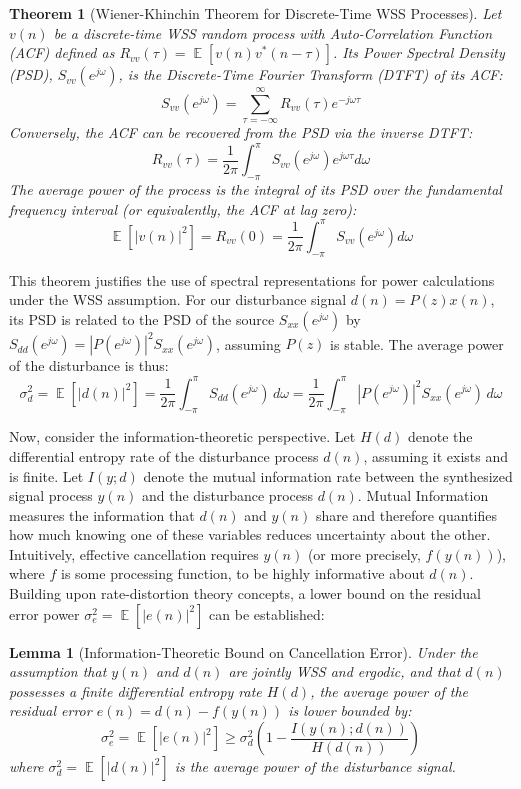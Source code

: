 \documentclass{article}
\DeclareMathOperator{\E}{\mathbb{E}} %
\newtheorem{theorem}{Theorem}
\newtheorem{lemma}{Lemma}
\begin{document}
\begin{theorem}[Wiener-Khinchin Theorem for Discrete-Time WSS Processes]
Let \( v(n) \) be a discrete-time WSS random process with Auto-Correlation Function (ACF) defined as \( R_{vv}(\tau) = \E[v(n)v^*(n-\tau)] \). Its Power Spectral Density (PSD), \( S_{vv}(e^{j\omega}) \), is the Discrete-Time Fourier Transform (DTFT) of its ACF:
$$ S_{vv}(e^{j\omega}) = \sum_{\tau=-\infty}^{\infty} R_{vv}(\tau) e^{-j\omega\tau} $$
Conversely, the ACF can be recovered from the PSD via the inverse DTFT:
$$ R_{vv}(\tau) = \frac{1}{2\pi} \int_{-\pi}^{\pi} S_{vv}(e^{j\omega}) e^{j\omega\tau} d\omega $$
The average power of the process is the integral of its PSD over the fundamental frequency interval (or equivalently, the ACF at lag zero):
$$ \E[|v(n)|^2] = R_{vv}(0) = \frac{1}{2\pi} \int_{-\pi}^{\pi} S_{vv}(e^{j\omega}) d\omega $$
\end{theorem}

This theorem justifies the use of spectral representations for power calculations under the WSS assumption. For our disturbance signal \( d(n) = P(z)x(n) \), its PSD is related to the PSD of the source \( S_{xx}(e^{j\omega}) \) by \( S_{dd}(e^{j\omega}) = |P(e^{j\omega})|^2 S_{xx}(e^{j\omega}) \), assuming \( P(z) \) is stable. The average power of the disturbance is thus:
\begin{equation}
\sigma_d^2 = \E[|d(n)|^2] = \frac{1}{2\pi} \int_{-\pi}^{\pi} S_{dd}(e^{j\omega}) \, d\omega = \frac{1}{2\pi} \int_{-\pi}^{\pi} |P(e^{j\omega})|^2 S_{xx}(e^{j\omega}) \, d\omega
\label{eq:d_power_psd}
\end{equation}

Now, consider the information-theoretic perspective. Let \( H(d) \) denote the differential entropy rate of the disturbance process \( d(n) \), assuming it exists and is finite. Let \( I(y; d) \) denote the mutual information rate between the synthesized signal process \( y(n) \) and the disturbance process \( d(n) \). Mutual Information measures the information that \(d(n)\) and \(y(n)\) share and therefore quantifies how much knowing one of these variables reduces uncertainty about the other. Intuitively, effective cancellation requires \( y(n) \) (or more precisely, \( f(y(n)) \)), where $f$ is some processing function, to be highly informative about \( d(n) \). Building upon rate-distortion theory concepts, a lower bound on the residual error power \( \sigma_e^2 = \E[|e(n)|^2] \) can be established:

\begin{lemma}[Information-Theoretic Bound on Cancellation Error]
Under the assumption that \( y(n) \) and \( d(n) \) are jointly WSS and ergodic, and that \( d(n) \) possesses a finite differential entropy rate \( H(d) \), the average power of the residual error \( e(n) = d(n) - f(y(n)) \) is lower bounded by:
\begin{equation}
\sigma_e^2 = \E[|e(n)|^2] \geq \sigma_d^2 \left( 1 - \frac{I(y(n); d(n))}{H(d(n))} \right)
\label{eq:info_bound_raw}
\end{equation}
where \( \sigma_d^2 = \E[|d(n)|^2] \) is the average power of the disturbance signal.
\end{lemma}
\end{document}
